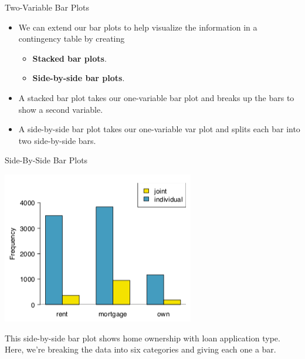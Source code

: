\begin{frame}{Two-Variable Bar Plots}
    \begin{itemize}
        \item We can extend our bar plots to help visualize the information in a contingency table by creating
        \begin{itemize}
            \item \textbf{Stacked bar plots}.
            \item \textbf{Side-by-side bar plots}.
        \end{itemize} 
        \item A stacked bar plot takes our one-variable bar plot and breaks up the bars to show a second variable.
        \item A side-by-side bar plot takes our one-variable var plot and splits each bar into two side-by-side bars.
    \end{itemize}
\end{frame}

\begin{frame}{Side-By-Side Bar Plots}
    \begin{center}
        \includegraphics[scale=0.45]{images/sidebar.png}
    \end{center}
    This side-by-side bar plot shows home ownership with loan application type. Here, we're breaking the data into six categories and giving each one a bar.
\end{frame}


